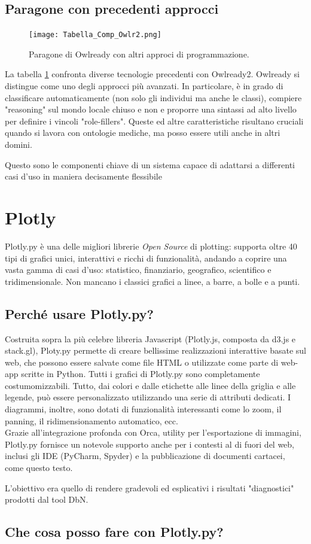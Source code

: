 \subsection{Paragone con precedenti approcci}

\begin{figure}[h]
	\texttt{[image: Tabella\_Comp\_Owlr2.png]}
	\caption{Paragone di Owlready con altri approci di programmazione.}
	\centering
	\label{fig:tabComparativa}
\end{figure}

La tabella \ref{fig:tabComparativa} confronta diverse tecnologie precedenti con Owlready2.
Owlready si distingue come uno degli approcci più avanzati. In particolare,
è in grado di classificare automaticamente (non solo gli individui ma anche le classi),
compiere "reasoning" sul mondo locale chiuso e non e proporre una sintassi ad alto livello per
definire i vincoli "role-fillers". Queste ed altre caratteristiche risultano cruciali quando
si lavora con ontologie mediche, ma posso essere utili anche in altri domini.

Questo sono le componenti chiave di un sistema capace di adattarsi a
differenti casi d’uso in maniera decisamente flessibile

\section{Plotly} \label{sec: Plotly}
Plotly.py è una delle migliori librerie \textit{Open Source} di plotting: supporta oltre 40 tipi di grafici unici, 
interattivi e ricchi di funzionalità, andando a coprire una vasta gamma di casi d'uso: statistico, finanziario, geografico, 
scientifico e tridimensionale. Non mancano i classici grafici a linee, a barre, a bolle e a punti. \cite{Plotly}

\subsection{Perché usare Plotly.py?}
Costruita sopra la più celebre libreria Javascript (Plotly.js, composta da d3.js e stack.gl), 
Ploty.py permette di creare bellissime realizzazioni interattive basate sul web, che possono
essere salvate come file HTML o utilizzate come parte di web-app scritte in Python.
Tutti i grafici di Plotly.py sono completamente costumomizzabili. 
Tutto, dai colori e dalle etichette alle linee della griglia e alle legende, può essere personalizzato 
utilizzando una serie di attributi dedicati.
I diagrammi, inoltre, sono dotati di funzionalità interessanti come lo zoom, il panning, il ridimensionamento automatico, ecc. \\
Grazie all'integrazione profonda con Orca, utility per l'esportazione di immagini, Plotly.py
fornisce un notevole supporto anche per i contesti al di fuori del web, inclusi gli IDE (PyCharm, Spyder)
e la pubblicazione di documenti cartacei, come questo testo.

L'obiettivo era quello di rendere gradevoli ed esplicativi i risultati "diagnostici" prodotti dal tool DbN.

\subsection{Che cosa posso fare con Plotly.py?}
\inputminted{Python}{codice/IntroPlotly.py}







